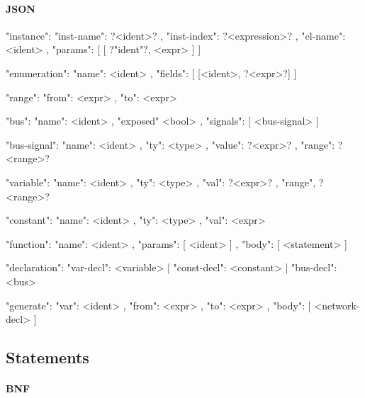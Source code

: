 \documentclass{article}
\begin{document}
\paragraph{JSON}
\begin{jsoncode}
{"instance": { "inst-name": ?<ident>?
             , "inst-index": ?<expression>?
             , "el-name": <ident>
             , "params": [ [ ?"ident"?, <expr> ] ]
             }
}

{"enumeration": { "name": <ident>
                , "fields": [ [<ident>, ?<expr>?] ]
                }
}

{"range": { "from": <expr>
          , "to": <expr>
          }
}

{"bus": { "name": <ident>
        , "exposed" <bool>
        , "signals": [ <bus-signal> ]
        }
}


{"bus-signal": { "name": <ident>
               , "ty": <type>
               , "value": ?<expr>?
               , "range": ?<range>?
               }
}

{"variable": { "name": <ident>
             , "ty": <type>
             , "val": ?<expr>?
             , "range", ?<range>?
             }
}

{"constant": { "name": <ident>
             , "ty": <type>
             , "val": <expr>
             }
}

{"function": { "name": <ident>
             , "params": [ <ident> ]
             , "body": [ <statement> ]
             }
}

{"declaration": { "var-decl": <variable>
                | "const-decl": <constant>
                | "bus-decl": <bus>
                }
}

{"generate": { "var": <ident>
             , "from": <expr>
             , "to": <expr>
             , "body": [ <network-decl> ]
             }
}
\end{jsoncode}

\subsection{Statements}

\paragraph{BNF}
\end{document}
